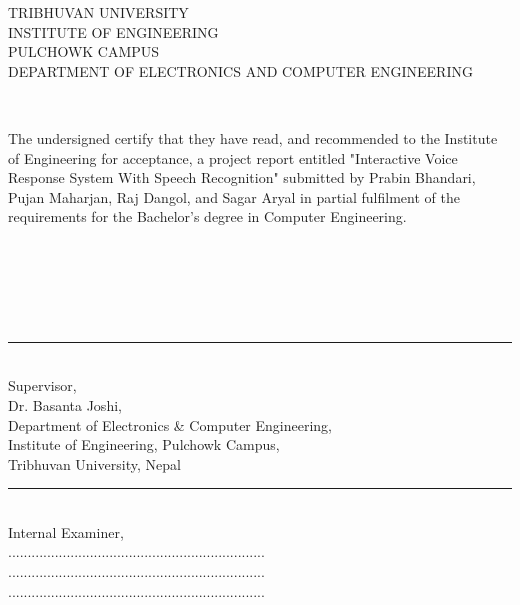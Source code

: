 
\newpage
{} {}
\setcounter{page}{2}

{
  \centering

  TRIBHUVAN UNIVERSITY\\
  INSTITUTE OF ENGINEERING\\
  PULCHOWK CAMPUS\\
  DEPARTMENT OF ELECTRONICS AND COMPUTER ENGINEERING\\
}

~

The undersigned certify that they have read, and recommended to the Institute of
Engineering for acceptance, a project report entitled "Interactive Voice Response System With Speech Recognition" 
submitted by Prabin Bhandari, Pujan Maharjan, Raj Dangol, and Sagar Aryal
in partial fulfilment of the requirements for the Bachelor's degree in Computer Engineering.  

~

~

~

\begin{minipage}[t]{0.55\textwidth}
  \rule{2in}{1pt}\\
  Supervisor,\\
  Dr. Basanta Joshi,\\
  \small
  Department of Electronics \& Computer Engineering,\\
  Institute of Engineering, Pulchowk Campus,\\
  Tribhuvan University, Nepal
\end{minipage}
\hspace{0.5cm}
\begin{minipage}[t]{0.40\textwidth}
  \rule{2in}{1pt}\\
  Internal Examiner,\\
  ..................................................................\\
  ..................................................................\\
  ..................................................................\\
\end{minipage}

~

~

~

